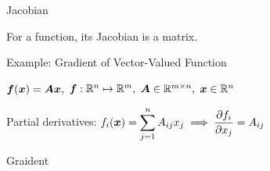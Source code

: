 \documentclass[fleqn,aspectratio=169]{beamer}
\begin{document}
\begin{frame}{Jacobian}


\bci
\item For a \bluef{$\realn \mapsto \realm$} function, its Jacobian is a  matrix. 
\eci

\end{frame}

\begin{frame}{Example: Gradient of Vector-Valued Function}

\bci
\item $\bm{f}(\bm{x}) = \bm{A} \bm{x},$ $\bm{f}: {\mathbb R}^{n} \mapsto {\mathbb R}^{m},$ $\bm{A} \in {\mathbb R}^{m \times n},$ $\bm{x} \in {\mathbb R}^{n}$

\item Partial derivatives: 
$
\displaystyle
f_i(\bm{x}) = \sum_{j=1}^n A_{ij} x_j \implies \frac{\partial f_i}{\partial x_j} = A_{ij}
$

\item Graident

\eci

\end{frame}
\end{document}
